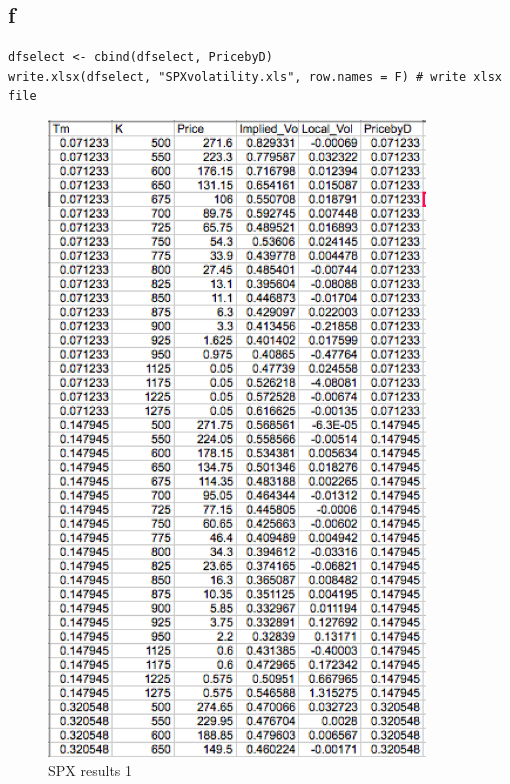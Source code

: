 \documentclass{article}
\begin{document}
\newpage

\subsection{f}
\begin{verbatim}
dfselect <- cbind(dfselect, PricebyD)
write.xlsx(dfselect, "SPXvolatility.xls", row.names = F) # write xlsx file
\end{verbatim}

\begin{figure}[h] 
\begin{center} 
\includegraphics[width = 10cm]{S1.png}  
\caption{SPX results 1} 
\end{center} 
\end{figure}
\end{document}
